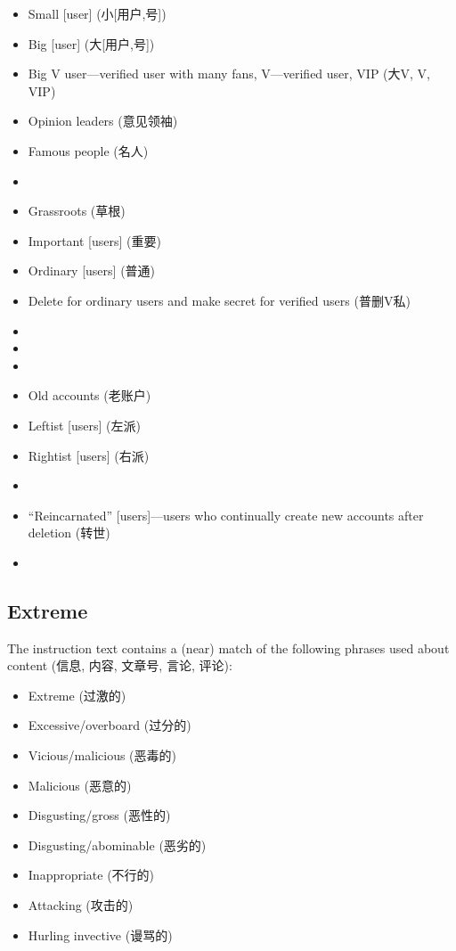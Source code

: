 \documentclass[12pt]{article}
\begin{document}
\begin{CJK*}{UTF8}{gbsn}
\begin{itemize}[noitemsep]
	\item Small [user] (小[用户,号])
	\item Big [user] (大[用户,号])
	\item Big V user---verified user with many fans, V---verified user, VIP (大V, V, VIP)
	\item Opinion leaders (意见领袖)
	\item Famous people (名人)
	\item {}
	\item Grassroots (草根)
	\item Important [users] (重要)
	\item Ordinary [users] (普通)
	\item Delete for ordinary users and make secret for verified users (普删V私)
	\item {}
	\item {}
	\item {}
	\item Old accounts (老账户)
	\item Leftist [users] (左派)
	\item Rightist [users] (右派)
	\item {}
	\item ``Reincarnated'' [users]---users who continually create new accounts after deletion (转世)
	\item {}
\end{itemize}

\subsection{Extreme}

The instruction text contains a (near) match of the following phrases used about content (信息, 内容, 文章号, 言论, 评论):

\begin{itemize}[noitemsep]
	\item Extreme (过激的)
	\item Excessive/overboard (过分的)
	\item Vicious/malicious (恶毒的)
	\item Malicious (恶意的)
	\item Disgusting/gross (恶性的)
	\item Disgusting/abominable (恶劣的)
	\item Inappropriate (不行的)
	\item Attacking (攻击的)
	\item Hurling invective (谩骂的)
\end{itemize}


\end{CJK*}
\end{document}
